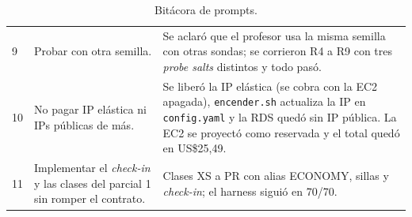 \documentclass[11pt,letterpaper]{article}
\begin{document}
\begin{table}[H]
\begin{tabular}{C{0.6cm} L{6.6cm} L{6.0cm}}
9 & Probar con otra semilla. & Se aclaró que el profesor usa la misma semilla con otras sondas; se corrieron R4 a R9 con tres \emph{probe salts} distintos y todo pasó. \\
10 & No pagar IP elástica ni IPs públicas de más. & Se liberó la IP elástica (se cobra con la EC2 apagada), \texttt{encender.sh} actualiza la IP en \texttt{config.yaml} y la RDS quedó sin IP pública. La EC2 se proyectó como reservada y el total quedó en US\$25,49. \\
11 & Implementar el \emph{check-in} y las clases del parcial 1 sin romper el contrato. & Clases XS a PR con alias ECONOMY, sillas y \emph{check-in}; el harness siguió en 70/70. \\
\bottomrule
\end{tabular}
\caption{Bitácora de prompts.}
\end{table}
\end{document}
